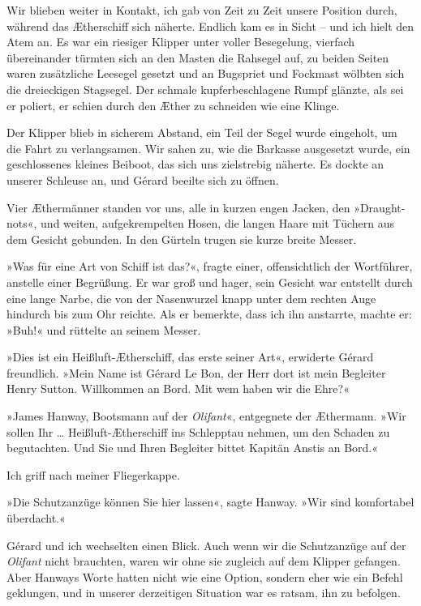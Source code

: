 \bigpar

Wir blieben weiter in Kontakt, ich gab von Zeit zu Zeit unsere
Position durch, während das Ætherschiff sich näherte. Endlich kam
es in Sicht – und ich hielt den Atem an. Es war ein riesiger
Klipper unter voller Besegelung, vierfach übereinander türmten sich
an den Masten die Rahsegel auf, zu beiden Seiten waren zusätzliche
Leesegel gesetzt und an Bugspriet und Fockmast wölbten sich die
dreieckigen Stagsegel. Der schmale kupferbeschlagene Rumpf glänzte,
als sei er poliert, er schien durch den Æther zu schneiden wie eine
Klinge.

Der Klipper blieb in sicherem Abstand, ein Teil der Segel wurde
eingeholt, um die Fahrt zu verlangsamen. Wir sahen zu, wie die
Barkasse ausgesetzt wurde, ein geschlossenes kleines Beiboot, das
sich uns zielstrebig näherte. Es dockte an unserer Schleuse an, und
Gérard beeilte sich zu öffnen.

Vier Æthermänner standen vor uns, alle in kurzen engen Jacken, den
»Draught-nots«, und weiten, aufgekrempelten Hosen, die langen Haare
mit Tüchern aus dem Gesicht gebunden. In den Gürteln trugen sie
kurze breite Messer.

»Was für eine Art von Schiff ist das?«, fragte einer,
offensichtlich der Wortführer, anstelle einer Begrüßung. Er war
groß und hager, sein Gesicht war entstellt durch eine lange Narbe,
die von der Nasenwurzel knapp unter dem rechten Auge hindurch bis
zum Ohr reichte. Als er bemerkte, dass ich ihn anstarrte, machte
er: »Buh!« und rüttelte an seinem Messer.

»Dies ist ein Heißluft-Ætherschiff, das erste seiner Art«,
erwiderte Gérard freundlich. »Mein Name ist Gérard Le Bon, der Herr
dort ist mein Begleiter Henry Sutton. Willkommen an Bord. Mit wem
haben wir die Ehre?«

»James Hanway, Bootsmann auf der \emph{Olifant}«, entgegnete der
Æthermann. »Wir sollen Ihr \ldots{} Heißluft-Ætherschiff ins Schlepptau
nehmen, um den Schaden zu begutachten. Und Sie und Ihren Begleiter
bittet Kapitän Anstis an Bord.«

Ich griff nach meiner Fliegerkappe.

»Die Schutzanzüge können Sie hier lassen«, sagte Hanway. »Wir sind
komfortabel überdacht.«

Gérard und ich wechselten einen Blick. Auch wenn wir die
Schutzanzüge auf der \emph{Olifant} nicht brauchten, waren wir ohne
sie zugleich auf dem Klipper gefangen. Aber Hanways Worte hatten
nicht wie eine Option, sondern eher wie ein Befehl geklungen, und
in unserer derzeitigen Situation war es ratsam, ihn zu befolgen.

